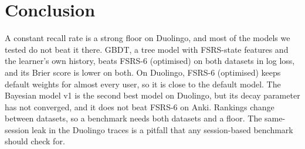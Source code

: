\section{Conclusion}
A constant recall rate is a strong floor on Duolingo, and most of the models we tested do not beat it there.
GBDT, a tree model with FSRS-state features and the learner's own history, beats FSRS-6 (optimised) on both datasets in log loss, and its Brier score is lower on both.
On Duolingo, FSRS-6 (optimised) keeps default weights for almost every user, so it is close to the default model. The Bayesian model v1 is the second best model on Duolingo, but its decay parameter has not converged, and it does not beat FSRS-6 on Anki.
Rankings change between datasets, so a benchmark needs both datasets and a floor.
The same-session leak in the Duolingo traces is a pitfall that any session-based benchmark should check for.
